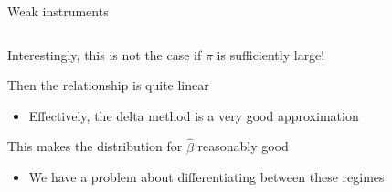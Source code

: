 \documentclass[notes,11pt, aspectratio=169]{beamer}
\newenvironment{wideitemize}{\itemize\addtolength{\itemsep}{10pt}}{\enditemize}
\begin{document}
\begin{frame}{Weak instruments}
  \begin{columns}[T] %
    \begin{column}{0.5\textwidth}
  \begin{wideitemize}
  \item<1-> Interestingly, this is not the case if $\pi$ is sufficiently large!
  \item<1-> Then the relationship is quite linear
    \begin{itemize}
    \item Effectively, the delta method is a very good approximation
    \end{itemize}
  \item<2-> This makes the distribution for $\hat{\beta}$ reasonably good 
    \begin{itemize}
    \item We have a problem about differentiating between these regimes
    \end{itemize}
  \end{wideitemize}
\end{column}
\begin{column}{0.5\textwidth}
\end{column}
\end{columns}
\end{frame}
\end{document}
